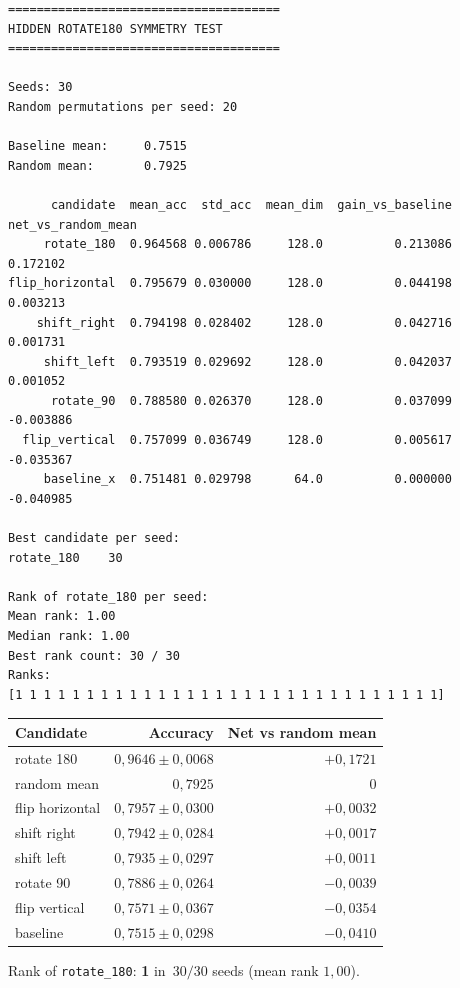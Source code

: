 \documentclass[11pt,a4paper]{report}
\begin{document}
\begin{verbatim}
======================================
HIDDEN ROTATE180 SYMMETRY TEST
======================================

Seeds: 30
Random permutations per seed: 20

Baseline mean:     0.7515
Random mean:       0.7925

      candidate  mean_acc  std_acc  mean_dim  gain_vs_baseline  net_vs_random_mean
     rotate_180  0.964568 0.006786     128.0          0.213086            0.172102
flip_horizontal  0.795679 0.030000     128.0          0.044198            0.003213
    shift_right  0.794198 0.028402     128.0          0.042716            0.001731
     shift_left  0.793519 0.029692     128.0          0.042037            0.001052
      rotate_90  0.788580 0.026370     128.0          0.037099           -0.003886
  flip_vertical  0.757099 0.036749     128.0          0.005617           -0.035367
     baseline_x  0.751481 0.029798      64.0          0.000000           -0.040985

Best candidate per seed:
rotate_180    30

Rank of rotate_180 per seed:
Mean rank: 1.00
Median rank: 1.00
Best rank count: 30 / 30
Ranks:
[1 1 1 1 1 1 1 1 1 1 1 1 1 1 1 1 1 1 1 1 1 1 1 1 1 1 1 1 1 1]
\end{verbatim}

\begin{center}
\begin{tabular}{lrr}
\toprule
Candidate & Accuracy & Net vs random mean \\
\midrule
rotate 180 & $0{,}9646\pm0{,}0068$ & $+0{,}1721$ \\
random mean & $0{,}7925$ & $0$ \\
flip horizontal & $0{,}7957\pm0{,}0300$ & $+0{,}0032$ \\
shift right & $0{,}7942\pm0{,}0284$ & $+0{,}0017$ \\
shift left & $0{,}7935\pm0{,}0297$ & $+0{,}0011$ \\
rotate 90 & $0{,}7886\pm0{,}0264$ & $-0{,}0039$ \\
flip vertical & $0{,}7571\pm0{,}0367$ & $-0{,}0354$ \\
baseline & $0{,}7515\pm0{,}0298$ & $-0{,}0410$ \\
\bottomrule
\end{tabular}
\end{center}

Rank of \texttt{rotate\_180}: \textbf{1} in~$30/30$ seeds (mean rank $1{,}00$).
\end{document}
